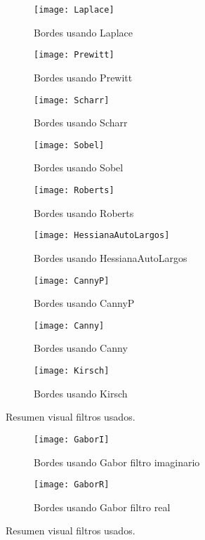 \begin{figure}
	\begin{subfigure}[c]{.5\linewidth}
	\centering\large \texttt{[image: Laplace]}
	\caption{Bordes usando Laplace}
	\end{subfigure}%
	\begin{subfigure}[c]{.5\linewidth}
	\centering\large \texttt{[image: Prewitt]}
	\caption{Bordes usando Prewitt}
	\end{subfigure}%

	\begin{subfigure}[c]{.5\linewidth}
	\centering\large \texttt{[image: Scharr]}
	\caption{Bordes usando Scharr}
	\end{subfigure}%
	\begin{subfigure}[c]{.5\linewidth}
	\centering\large \texttt{[image: Sobel]}
	\caption{Bordes usando Sobel}
	\end{subfigure}%
	
	\begin{subfigure}[c]{.5\linewidth}
	\centering\large \texttt{[image: Roberts]}
	\caption{Bordes usando Roberts}
	\end{subfigure}%
	\begin{subfigure}[c]{.5\linewidth}
	\centering\large \texttt{[image: HessianaAutoLargos]}
	\caption{Bordes usando HessianaAutoLargos}
	\end{subfigure}%
	
	\begin{subfigure}[c]{.5\linewidth}
	\centering\large \texttt{[image: CannyP]}
	\caption{Bordes usando CannyP}
	\end{subfigure}%
	\begin{subfigure}[c]{.5\linewidth}
	\centering\large \texttt{[image: Canny]}
	\caption{Bordes usando Canny}
	\end{subfigure}%
	
	\begin{subfigure}[c]{.5\linewidth}
	\centering\large \texttt{[image: Kirsch]}
	\caption{Bordes usando Kirsch}
	\end{subfigure}	

\caption{Resumen visual filtros usados.}\label{fig:1.1}
\end{figure}


\begin{figure}
	\begin{subfigure}[c]{.5\linewidth}
	\centering\large \texttt{[image: GaborI]}
	\caption{Bordes usando Gabor filtro imaginario}
	\end{subfigure}%
	\begin{subfigure}[c]{.5\linewidth}
	\centering\large \texttt{[image: GaborR]}
	\caption{Bordes usando Gabor filtro real}
	\end{subfigure}

\caption{Resumen visual filtros usados.}\label{fig:1.2}
\end{figure}



